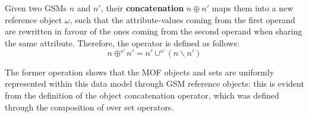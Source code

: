 \begin{definition}
	Given two GSMs  $n$ and $n'$, their \textbf{concatenation} $n\oplus n'$ maps them into a new reference object $\omega$, such that the attribute-values coming from the first operand are rewritten in favour of the ones coming from the second operand when sharing the same attribute. Therefore, the operator is defined as follows:
	\[n\oplus^\omega n'=n'\cup^\omega (n\backslash n')\]
\end{definition}

The former operation shows that the MOF objects and sets are uniformly represented within this data model through GSM reference objects: this is evident from the definition of the object concatenation operator, which was defined through the composition of over set operators.
